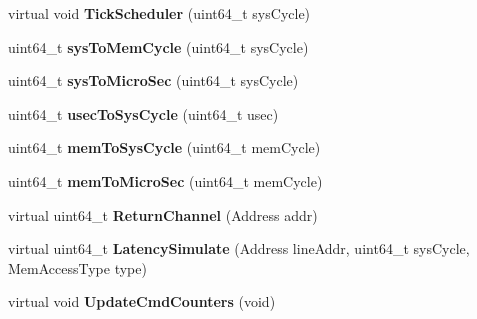 \begin{DoxyCompactItemize}
\item 
\hypertarget{classMemControllerBase_a2cd02ede21ab33ea364bd2ae14df35d9}{virtual void {\bfseries Tick\-Scheduler} (uint64\-\_\-t sys\-Cycle)}\label{classMemControllerBase_a2cd02ede21ab33ea364bd2ae14df35d9}

\item 
\hypertarget{classMemControllerBase_a7177fcd259a98335c3c32b1dc86c54f6}{uint64\-\_\-t {\bfseries sys\-To\-Mem\-Cycle} (uint64\-\_\-t sys\-Cycle)}\label{classMemControllerBase_a7177fcd259a98335c3c32b1dc86c54f6}

\item 
\hypertarget{classMemControllerBase_aa09dc5a73cb7437ff5aac88515e469e6}{uint64\-\_\-t {\bfseries sys\-To\-Micro\-Sec} (uint64\-\_\-t sys\-Cycle)}\label{classMemControllerBase_aa09dc5a73cb7437ff5aac88515e469e6}

\item 
\hypertarget{classMemControllerBase_aaf2fdcacf48b08800ffd1aabd8ac36b9}{uint64\-\_\-t {\bfseries usec\-To\-Sys\-Cycle} (uint64\-\_\-t usec)}\label{classMemControllerBase_aaf2fdcacf48b08800ffd1aabd8ac36b9}

\item 
\hypertarget{classMemControllerBase_aab7c0e55f63511b8ce54ec2d765115ad}{uint64\-\_\-t {\bfseries mem\-To\-Sys\-Cycle} (uint64\-\_\-t mem\-Cycle)}\label{classMemControllerBase_aab7c0e55f63511b8ce54ec2d765115ad}

\item 
\hypertarget{classMemControllerBase_a1516dc45607d418a6171562927486b08}{uint64\-\_\-t {\bfseries mem\-To\-Micro\-Sec} (uint64\-\_\-t mem\-Cycle)}\label{classMemControllerBase_a1516dc45607d418a6171562927486b08}

\item 
\hypertarget{classMemControllerBase_ae7f8c73acfcf4f5893f14948b8e02400}{virtual uint64\-\_\-t {\bfseries Return\-Channel} (Address addr)}\label{classMemControllerBase_ae7f8c73acfcf4f5893f14948b8e02400}

\item 
\hypertarget{classMemControllerBase_a736c338ffec5b19d7e3545a1ed1fd9a1}{virtual uint64\-\_\-t {\bfseries Latency\-Simulate} (Address line\-Addr, uint64\-\_\-t sys\-Cycle, Mem\-Access\-Type type)}\label{classMemControllerBase_a736c338ffec5b19d7e3545a1ed1fd9a1}

\item 
\hypertarget{classMemControllerBase_a07e794c7ff76ae8fd42ecdf0088316e1}{virtual void {\bfseries Update\-Cmd\-Counters} (void)}\label{classMemControllerBase_a07e794c7ff76ae8fd42ecdf0088316e1}


\end{DoxyCompactItemize}
